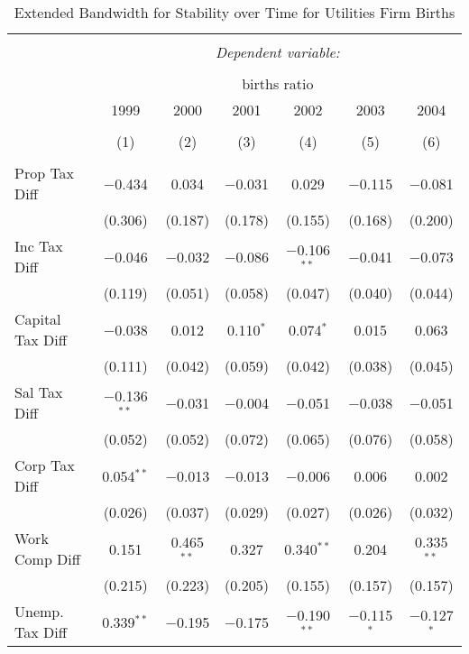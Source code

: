 
\begin{table}[!htbp] \centering 
  \caption{Extended Bandwidth for Stability over Time for  Utilities Firm Births} 
  \label{22 ebyear} 
\small 
\begin{tabular}{@{\extracolsep{5pt}}lcccccc} 
\\[-1.8ex]\hline 
\hline \\[-1.8ex] 
 & \multicolumn{6}{c}{\textit{Dependent variable:}} \\ 
\cline{2-7} 
\\[-1.8ex] & \multicolumn{6}{c}{births ratio} \\ 
 & 1999 & 2000 & 2001 & 2002 & 2003 & 2004 \\ 
\\[-1.8ex] & (1) & (2) & (3) & (4) & (5) & (6)\\ 
\hline \\[-1.8ex] 
 Prop Tax Diff & $-$0.434 & 0.034 & $-$0.031 & 0.029 & $-$0.115 & $-$0.081 \\ 
  & (0.306) & (0.187) & (0.178) & (0.155) & (0.168) & (0.200) \\ 
  Inc Tax Diff & $-$0.046 & $-$0.032 & $-$0.086 & $-$0.106$^{**}$ & $-$0.041 & $-$0.073 \\ 
  & (0.119) & (0.051) & (0.058) & (0.047) & (0.040) & (0.044) \\ 
  Capital Tax Diff & $-$0.038 & 0.012 & 0.110$^{*}$ & 0.074$^{*}$ & 0.015 & 0.063 \\ 
  & (0.111) & (0.042) & (0.059) & (0.042) & (0.038) & (0.045) \\ 
  Sal Tax Diff & $-$0.136$^{**}$ & $-$0.031 & $-$0.004 & $-$0.051 & $-$0.038 & $-$0.051 \\ 
  & (0.052) & (0.052) & (0.072) & (0.065) & (0.076) & (0.058) \\ 
  Corp Tax Diff & 0.054$^{**}$ & $-$0.013 & $-$0.013 & $-$0.006 & 0.006 & 0.002 \\ 
  & (0.026) & (0.037) & (0.029) & (0.027) & (0.026) & (0.032) \\ 
  Work Comp Diff & 0.151 & 0.465$^{**}$ & 0.327 & 0.340$^{**}$ & 0.204 & 0.335$^{**}$ \\ 
  & (0.215) & (0.223) & (0.205) & (0.155) & (0.157) & (0.157) \\ 
  Unemp. Tax Diff & 0.339$^{**}$ & $-$0.195 & $-$0.175 & $-$0.190$^{**}$ & $-$0.115$^{*}$ & $-$0.127$^{*}$ \\ 

\end{tabular}
\end{table}
